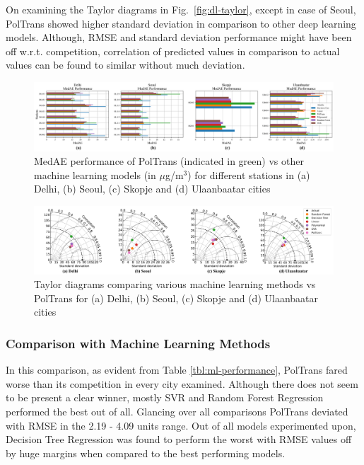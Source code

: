 \documentclass[10pt,journal]{IEEEtran}
\begin{document}
On examining the Taylor diagrams in  Fig.~\ref{fig:dl-taylor}, except in case of Seoul, {PolTrans}  showed higher standard deviation in comparison to other deep learning models. Although, RMSE and standard deviation performance might have been off w.r.t. competition, correlation of predicted values in comparison to actual values can be found to similar without much deviation.

\begin{figure}[h]
\centering
\includegraphics[scale=0.365]{../paper_figures/ml_medae.png}
\caption{MedAE performance of {PolTrans} (indicated in green) vs other machine learning models (in $\mu$g/m$^{3}$) for different stations in (a) Delhi, (b) Seoul, (c) Skopje and (d) Ulaanbaatar cities}
\label{fig:ml-medae}
\end{figure}

\begin{figure}[h]
\centering
\includegraphics[width=18cm]{../paper_figures/merged_taylor_ml.png}
\caption{Taylor diagrams comparing various machine learning methods vs {PolTrans}  for (a) Delhi, (b) Seoul, (c) Skopje and (d) Ulaanbaatar cities}
\label{fig:ml-taylor}
\end{figure}

\subsubsection{Comparison with Machine Learning Methods}
\label{sec:ml-comp}

In this comparison, as evident from Table \ref{tbl:ml-performance}, {PolTrans}  fared worse than its competition in every city examined. Although there does not seem to be present a clear winner, mostly SVR and Random Forest Regression performed the best out of all. Glancing over all comparisons  {PolTrans}  deviated with RMSE in the 2.19 - 4.09 units range. Out of all models experimented upon, Decision Tree Regression was found to perform the worst with RMSE values off by huge margins when compared to the best performing models. 
\end{document}
